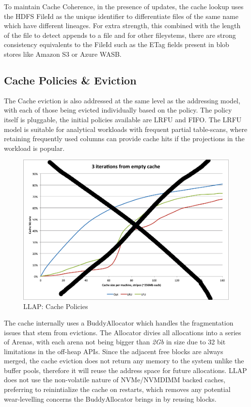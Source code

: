 To maintain Cache Coherence, in the presence of updates, the cache lookup uses the HDFS FileId as the unique identifier to 
differentiate files of the same name which have different lineages. For extra strength, this combined with the length of the file
to detect appends to a file and for other fileystems, there are strong consistency equivalents to the FileId such as the ETag 
fields present in blob stores like Amazon S3\cite{S3} or Azure WASB\cite{WASB}. 

\subsection{Cache Policies \& Eviction}

The Cache eviction is also addressed at the same level as the addressing model, with each of those being evicted individually based
on the policy. The policy itself is pluggable, the initial policies available are LRFU and FIFO. The LRFU model is suitable for analytical
workloads with frequent partial table-scans, where retaining frequently used columns can provide cache hits if the projections in the
workload is popular.

\begin{figure}[H]
\centering
\includegraphics[width=0.8\columnwidth]{figures/evictions.png}
\caption{LLAP: Cache Policies}
\label{fig:eviction}
\end{figure} 

The cache internally uses a BuddyAllocator which handles the fragmentation issues that stem from evictions. The Allocator divies all
allocations into a series of Arenas, with each arena not being bigger than \emph{2Gb} in size due to 32 bit limitations in 
the off-heap APIs. Since the adjacent free blocks are always merged, the cache eviction does not return any memory to the system unlike
the buffer pools, therefore it will reuse the address space for future allocations. LLAP does not use the non-volatile nature of NVMe/NVMDIMM
backed caches, preferring to reinintialize the cache on restarts, which removes any potential wear-levelling concerns the BuddyAllocator
brings in by reusing blocks.

